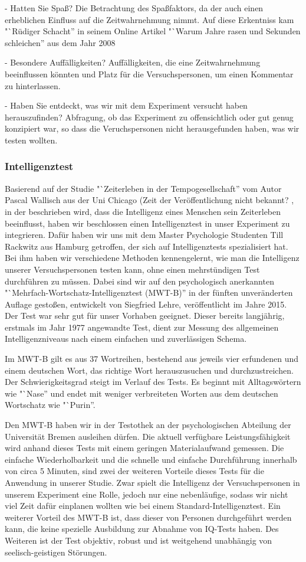 \documentclass{Bericht}
\begin{document}
- Hatten Sie Spaß?
Die Betrachtung des Spaßfaktors,  da der auch einen erheblichen Einfluss auf die Zeitwahrnehmung nimmt. Auf diese Erkentniss kam "`Rüdiger Schacht'' in seinem Online Artikel "`Warum Jahre rasen und Sekunden schleichen'' aus dem Jahr 2008 \cite{Spass}

- Besondere Auffälligkeiten?
Auffälligkeiten, die eine Zeitwahrnehmung beeinflussen könnten und Platz für die Versuchspersonen, um einen Kommentar zu hinterlassen.

- Haben Sie entdeckt, was wir mit dem Experiment versucht haben herauszufinden?
Abfragung, ob das Experiment zu offensichtlich oder gut genug konzipiert war, so dass die Veruchspersonen nicht herausgefunden haben, was wir testen wollten. 

\subsubsection{Intelligenztest}
Basierend auf der Studie "`Zeiterleben in der Tempogesellschaft'' vom Autor Pascal Wallisch aus der Uni Chicago (Zeit der Veröffentlichung nicht bekannt? \cite{Tempo}, in der beschrieben wird, dass die Intelligenz eines Menschen sein Zeiterleben beeinflusst, haben wir beschlossen einen Intelligenztest in unser Experiment zu integrieren. Dafür haben wir uns mit dem Master Psychologie Studenten Till Rackwitz aus Hamburg getroffen, der sich auf Intelligenztests spezialisiert hat. Bei ihm haben wir verschiedene Methoden kennengelernt, wie man die Intelligenz unserer Versuchspersonen testen kann, ohne einen mehrstündigen Test durchführen zu müssen. Dabei sind wir auf den psychologisch anerkannten "`Mehrfach-Wortschatz-Intelligenztest (MWT-B)'' in der fünften unveränderten Auflage gestoßen, entwickelt von Siegfried Lehre, veröffentlicht im Jahre 2015. Der Test war sehr gut für unser Vorhaben geeignet. Dieser bereits langjährig, erstmals im Jahr 1977 angewandte Test, dient zur Messung des allgemeinen Intelligenzniveaus nach einem einfachen und zuverlässigen Schema.

Im MWT-B gilt es aus 37 Wortreihen, bestehend aus jeweils vier erfundenen und einem deutschen Wort, das richtige Wort herauszusuchen und durchzustreichen. Der Schwierigkeitsgrad steigt im Verlauf des Tests. Es beginnt mit Alltagswörtern wie "`Nase'' und endet mit weniger verbreiteten Worten aus dem deutschen Wortschatz wie "`Purin''.

Den MWT-B haben wir in der Testothek an der psychologischen Abteilung der Universität Bremen ausleihen dürfen. Die aktuell verfügbare Leistungsfähigkeit wird anhand dieses Tests mit einem geringen Materialaufwand gemessen. Die einfache Wiederholbarkeit und die schnelle und einfache Durchführung innerhalb von circa 5 Minuten, sind zwei der weiteren Vorteile dieses Tests für die Anwendung in unserer Studie. Zwar spielt die Intelligenz der Versuchspersonen in unserem Experiment eine Rolle, jedoch nur eine nebenläufige, sodass wir nicht viel Zeit dafür einplanen wollten wie bei einem Standard-Intelligenztest. Ein weiterer Vorteil des MWT-B ist, dass dieser von Personen durchgeführt werden kann, die keine spezielle Ausbildung zur Abnahme von IQ-Tests haben. Des Weiteren ist der Test objektiv, robust und ist weitgehend unabhängig von seelisch-geistigen Störungen.
\end{document}
